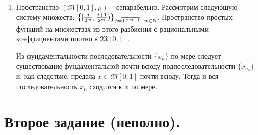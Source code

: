 \begin{solve}
\begin{enumerate}
        Пусть $x_n \xrightarrow{\mu} x, n \rightarrow \infty$. Поскольку $\frac{|x_n - x|}{1 + |x_n - x|} \leq 1$ и $\frac{|x_n - x|}{1 + |x_n - x|} \leq |x_n - x|$, то при $\epsilon > 0\colon$
        \[
            \rho(x_n,x) = \int_{|x_n - x| < \epsilon} \dfrac{|x_n - x|}{1 + |x_n - x|}dt + \int_{|x_n -x| \geq \epsilon} \dfrac{|x_n - x|}{1 + |x_n - x|}dt \leq \epsilon + \mu\{|x_n - x| \geq \epsilon\} \rightarrow 0, n \rightarrow \infty, \epsilon \rightarrow +0.
        \]

        Из этого очевидно следует секвенциальная непрерывность отображения $\id$ в обе стороны. Заметим, что секвенциальная топология на $\tau_\mu$ совпадает с $\tau_\mu$, а следовательно, в силу того что $\tau_\rho$ -- first countable, то отображение непрерывно и топологии совпадают.
        \item Пространство $(\mathfrak{M}[0, 1], \rho)$ -- сепарабельно. Рассмотрим следующую систему множеств: $\left\{[\frac{j}{2^m}, \frac{j + 1}{2^m})\right\}_{j = \overline{0, 2^{m - 1}}, \ m \in \mathbb{N}}$. Пространство простых функций на множествах из этого разбиения с рациональными коэффициентами плотно в $\mathfrak{M}[0, 1]$.

        Из фундаментальности последовательности $\{x_n\}$ по мере следует существование фундаментальной почти всюду подпоследовательности $\{x_{n_k}\}$ и, как следствие, предела $x \in \mathfrak{M}[0, 1]$ почти всюду. Тогда и вся последовательность $x_n$ сходится к $x$ по мере.
    \end{enumerate}
\end{solve}
\section{Второе задание (неполно).}
